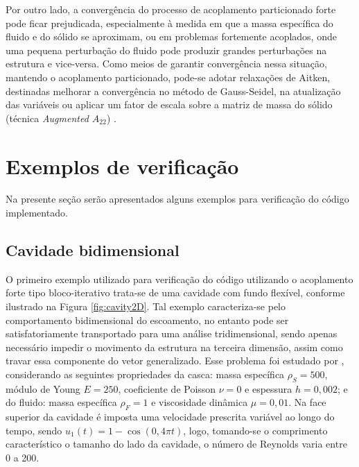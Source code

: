 Por outro lado, a convergência do processo de acoplamento particionado forte pode ficar prejudicada, especialmente à medida em que a massa específica do fluido e do sólido se aproximam, ou em problemas fortemente acoplados, onde uma pequena perturbação do fluido pode produzir grandes perturbações na estrutura e vice-versa. Como meios de garantir convergência nessa situação, mantendo o acoplamento particionado, pode-se adotar relaxações de Aitken, destinadas melhorar a convergência no método de Gauss-Seidel, na atualização das variáveis \cite{fernandes2019ale} ou aplicar um fator de escala sobre a matriz de massa do sólido (técnica \textit{Augmented $A_{22}$}) \cite{bazilevs2013computational}.

\section{Exemplos de verificação}

Na presente seção serão apresentados alguns exemplos para verificação do código implementado.

\subsection{Cavidade bidimensional}

O primeiro exemplo utilizado para verificação do código utilizando o acoplamento forte tipo bloco-iterativo trata-se de uma cavidade com fundo flexível, conforme ilustrado na Figura \ref{fig:cavity2D}. Tal exemplo caracteriza-se pelo comportamento bidimensional do escoamento, no entanto pode ser satisfatoriamente transportado para uma análise tridimensional, sendo apenas necessário impedir o movimento da estrutura na terceira dimensão, assim como travar essa componente do vetor generalizado. Esse problema foi estudado por , considerando as seguintes propriedades da casca: massa específica $\rho_S=500$, módulo de Young $E=250$, coeficiente de Poisson $\nu=0$ e espessura $h=0,002$; e do fluido: massa específica $\rho_F=1$ e viscosidade dinâmica $\mu=0,01$. Na face superior da cavidade é imposta uma velocidade prescrita variável ao longo do tempo, sendo $u_1(t)=1-\cos{(0,4\pi t)}$, logo, tomando-se o comprimento característico o tamanho do lado da cavidade, o número de Reynolds varia entre 0 a 200.

